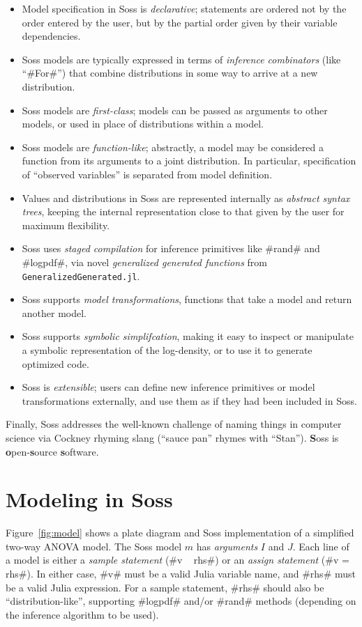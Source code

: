 \documentclass[anonymous=false, %
               format=acmsmall, %
               review=true, %
               screen=true, %
               nonacm=true]{acmart}
\begin{document}
\begin{itemize}
    \item Model specification in Soss is \emph{declarative}; statements are ordered not by the order entered by the user, but by the partial order given by their variable dependencies.
    \item Soss models are typically expressed in terms of \emph{inference combinators} (like ``\jl#For#'') that combine distributions in some way to arrive at a new distribution.
    \item Soss models are \emph{first-class}; models can be passed as arguments to other models, or used in place of distributions within a model.
    \item Soss models are \emph{function-like}; abstractly, a model may be considered a function from its arguments to a joint distribution. In particular, specification of ``observed variables'' is separated from model definition.
    \item Values and distributions in Soss are represented internally as \emph{abstract syntax trees}, keeping the internal representation close to that given by the user for maximum flexibility.
    \item Soss uses \emph{staged compilation} for inference primitives like \jl#rand# and \jl#logpdf#, via novel \emph{generalized generated functions} from \texttt{GeneralizedGenerated.jl}.
    \item Soss supports \emph{model transformations}, functions that take a model and return another model.
    \item Soss supports \emph{symbolic simplifcation}, making it easy to inspect or manipulate a symbolic representation of the log-density, or to use it to generate optimized code.
    \item Soss is \emph{extensible}; users can define new inference primitives or model transformations externally, and use them as if they had been included in Soss.
\end{itemize}

Finally, Soss addresses the well-known challenge of naming things in computer science via Cockney rhyming slang (``sauce pan'' rhymes with ``Stan''). {\bf S}oss is {\bf o}pen-{\bf s}ource {\bf s}oftware.

\section{Modeling in Soss}

Figure~\ref{fig:model} shows a plate diagram and Soss implementation of a simplified two-way ANOVA model. The Soss model $m$ has \emph{arguments} $I$ and $J$. Each line of a model is either a \emph{sample statement} (\jl#v ~ rhs#) or an \emph{assign statement} (\jl#v = rhs#). In either case, \jl#v# must be a valid Julia variable name, and \jl#rhs# must be a valid Julia expression. For a sample statement, \jl#rhs# should also be ``distribution-like'', supporting \jl#logpdf# and/or \jl#rand# methods (depending on the inference algorithm to be used).
\end{document}
